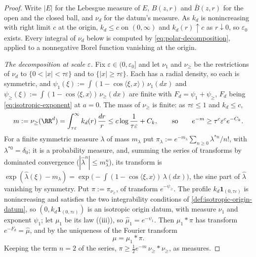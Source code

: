\begin{proof}
\leanok
Write $|E|$ for the Lebesgue measure of $E$, $B(z,r)$ and $\bar B(z,r)$ for the open and the closed
ball, and $\nu_d$ for the datum's \Levy{} measure. As $k_d$ is nonincreasing with right limit $c$ at
the origin, $k_d \le c$ on $(0,\infty)$ and $k_d(r) \uparrow c$ as $r \downarrow 0$, so
$\varepsilon_0$ exists. Every integral of $\nu_d$ below is computed by \ref{eq:polar-decomposition},
applied to a nonnegative Borel function vanishing at the origin.

\emph{The decomposition at scale $\varepsilon$.} Fix $\varepsilon \in (0,\varepsilon_0]$ and let
$\nu_1$ and $\nu_{\ge}$ be the restrictions of $\nu_d$ to $\{0 < |x| < \tau\varepsilon\}$ and to
$\{|x| \ge \tau\varepsilon\}$. Each has a radial density, so each is symmetric, and
$\psi_1(\xi) := \int(1 - \cos\langle\xi,x\rangle)\,\nu_1(dx)$ and
$\psi_{\ge}(\xi) := \int(1 - \cos\langle\xi,x\rangle)\,\nu_{\ge}(dx)$ are finite with
$F_d = \psi_1 + \psi_{\ge}$, $F_d$ being \ref{eq:isotropic-exponent} at $a = 0$. The mass of
$\nu_{\ge}$ is finite: as $\tau\varepsilon \le 1$ and $k_d \le c$,
\[
  m := \nu_{\ge}(\RR^d) = \int_{\tau\varepsilon}^{\infty}k_d(r)\,\frac{dr}{r}
   \le c\log\frac{1}{\tau\varepsilon} + C_k ,
  \qquad\text{so}\qquad e^{-m} \ge \tau^c\varepsilon^c e^{-C_k} .
\]
For a finite symmetric measure $\lambda$ of mass $m_\lambda$ put
$\pi_\lambda := e^{-m_\lambda}\sum_{n\ge0}\lambda^{*n}/n!$, with $\lambda^{*0} = \delta_0$; it is a
probability measure, and, summing the series of transforms by dominated convergence
($|\widehat\lambda^n| \le m_\lambda^n$), its transform is
$\exp(\widehat\lambda(\xi) - m_\lambda) = \exp\bigl(-\int(1 - \cos\langle\xi,x\rangle)\,\lambda(dx)\bigr)$,
the sine part of $\widehat\lambda$ vanishing by symmetry. Put $\pi := \pi_{\nu_{\ge}}$, of transform
$e^{-\psi_{\ge}}$. The profile $k_d\mathbf 1_{(0,\tau\varepsilon)}$ is nonincreasing and satisfies the
two integrability conditions of \ref{def:isotropic-origin-datum}, so
$(0, k_d\mathbf 1_{(0,\tau\varepsilon)})$ is an isotropic origin datum, with \Levy{} measure $\nu_1$
and exponent $\psi_1$; let $\mu_1$ be its law ((iii)), so $\widehat\mu_1 = e^{-\psi_1}$.
Then $\mu_1 * \pi$ has transform $e^{-F_d} = \widehat\mu$, and by the uniqueness of the Fourier
transform
\[
  \mu = \mu_1 * \pi .
\]
Keeping the term $n = 2$ of the series, $\pi \ge \tfrac12 e^{-m}\,\nu_{\ge} * \nu_{\ge}$, as measures.


\end{proof}
